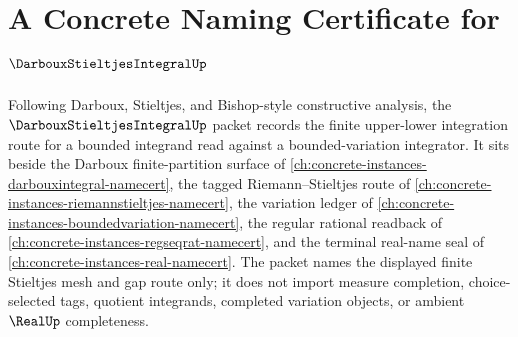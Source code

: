 \chapter{A Concrete Naming Certificate for $\DarbouxStieltjesIntegralUp$}
\label{ch:concrete-instances-darboux-stieltjes-integral-namecert}

Following Darboux, Stieltjes, and Bishop-style constructive analysis, the $\DarbouxStieltjesIntegralUp$ packet records the finite upper-lower integration route for a bounded integrand read against a bounded-variation integrator. It sits beside the Darboux finite-partition surface of \autoref{ch:concrete-instances-darbouxintegral-namecert}, the tagged Riemann--Stieltjes route of \autoref{ch:concrete-instances-riemannstieltjes-namecert}, the variation ledger of \autoref{ch:concrete-instances-boundedvariation-namecert}, the regular rational readback of \autoref{ch:concrete-instances-regseqrat-namecert}, and the terminal real-name seal of \autoref{ch:concrete-instances-real-namecert}. The packet names the displayed finite Stieltjes mesh and gap route only; it does not import measure completion, choice-selected tags, quotient integrands, completed variation objects, or ambient $\RealUp$ completeness.

